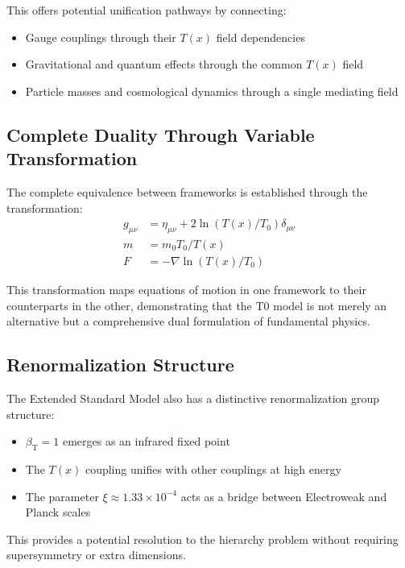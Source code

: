 \documentclass[12pt,a4paper]{article}
\newcommand{\Tfield}{T(x)}
\newcommand{\betaT}{\beta_{\text{T}}}
\begin{document}
	This offers potential unification pathways by connecting:
	\begin{itemize}
		\item Gauge couplings through their $\Tfield$ field dependencies
		\item Gravitational and quantum effects through the common $\Tfield$ field
		\item Particle masses and cosmological dynamics through a single mediating field
	\end{itemize}
	
	\subsection{Complete Duality Through Variable Transformation}
	
	The complete equivalence between frameworks is established through the transformation:
	\begin{equation}
		\begin{aligned}
			g_{\mu\nu} &= \eta_{\mu\nu} + 2\ln(T(x)/T_0)\delta_{\mu\nu} \\
			m &= m_0T_0/T(x) \\
			F &= -\nabla\ln(T(x)/T_0)
		\end{aligned}
	\end{equation}
	
	This transformation maps equations of motion in one framework to their counterparts in the other, demonstrating that the T0 model is not merely an alternative but a comprehensive dual formulation of fundamental physics.
	
	\subsection{Renormalization Structure}
	
	The Extended Standard Model also has a distinctive renormalization group structure:
	\begin{itemize}
		\item $\betaT = 1$ emerges as an infrared fixed point
		\item The $\Tfield$ coupling unifies with other couplings at high energy
		\item The parameter $\xi \approx 1.33 \times 10^{-4}$ acts as a bridge between Electroweak and Planck scales
	\end{itemize}
	
	This provides a potential resolution to the hierarchy problem without requiring supersymmetry or extra dimensions.
	
\end{document}
